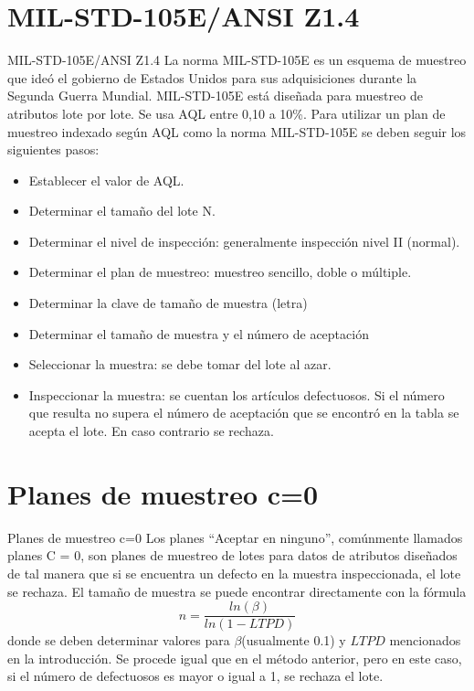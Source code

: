 \documentclass[10pt]{beamer}
\begin{document}
\section{MIL-STD-105E/ANSI Z1.4}
\begin{frame}{MIL-STD-105E/ANSI Z1.4}
La norma MIL-STD-105E es un esquema de muestreo que ideó el gobierno de Estados Unidos para sus adquisiciones durante la Segunda Guerra Mundial. MIL-STD-105E está diseñada para muestreo de atributos lote por lote. Se usa AQL entre 0,10 a 10\%. Para utilizar un plan de muestreo indexado según AQL como la norma MIL-STD-105E se deben seguir los siguientes pasos:
\begin{itemize}
\item[1.] Establecer el valor de AQL.
\item[2.] Determinar el tamaño del lote N.
\item[3.] Determinar el nivel de inspección: generalmente inspección nivel II (normal).
\item[4.] Determinar el plan de muestreo: muestreo sencillo, doble o múltiple.
\item[5.] Determinar la clave de tamaño de muestra (letra)
\item[6.] Determinar el tamaño de muestra y el número de aceptación
\item[7.] Seleccionar la muestra: se debe tomar del lote al azar.
\item[8.] Inspeccionar la muestra: se cuentan los artículos defectuosos. Si el número que resulta no supera el número de aceptación que se encontró en la tabla se acepta el lote. En caso contrario se rechaza.
\end{itemize}
\end{frame}

\section{Planes de muestreo c=0}
\begin{frame}{Planes de muestreo c=0}
Los planes ``Aceptar en ninguno'', comúnmente llamados planes C = 0, son planes de muestreo de lotes para datos de atributos diseñados de tal manera que si se encuentra un defecto en la muestra inspeccionada, el lote se rechaza. El tamaño de muestra se puede encontrar directamente con la fórmula
$$n=\frac{ln(\beta)}{ln(1-LTPD)}$$ 
donde se deben determinar valores para $\beta$(usualmente 0.1) y $LTPD$ mencionados en la introducción. Se procede igual que en el método anterior, pero en este caso, si el número de defectuosos es mayor o igual a 1, se rechaza el lote.
\end{frame}
\end{document}
